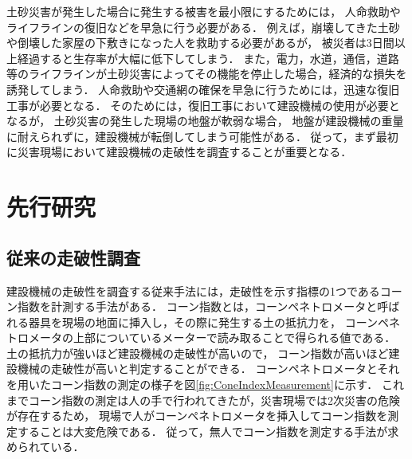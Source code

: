 \clearpage

土砂災害が発生した場合に発生する被害を最小限にするためには，
人命救助やライフラインの復旧などを早急に行う必要がある\cite{国交省2016}．
例えば，崩壊してきた土砂や倒壊した家屋の下敷きになった人を救助する必要があるが，
被災者は3日間以上経過すると生存率が大幅に低下してしまう\cite{国交省2002}．
また，電力，水道，通信，道路等のライフラインが土砂災害によってその機能を停止した場合，経済的な損失を誘発してしまう\cite{豊田2008}\cite{豊田2010}．
人命救助や交通網の確保を早急に行うためには，迅速な復旧工事が必要となる．
そのためには，復旧工事において建設機械の使用が必要となるが，
土砂災害の発生した現場の地盤が軟弱な場合，
地盤が建設機械の重量に耐えられずに，建設機械が転倒してしまう可能性がある\cite{玉手2014}\cite{玉手2008}．
従って，まず最初に災害現場において建設機械の走破性を調査することが重要となる．



\clearpage


\section{先行研究}\label{sec:PreviousStudy}

\subsection{従来の走破性調査}\label{ssec:TraditionalMethod}

建設機械の走破性を調査する従来手法には，走破性を示す指標の1つであるコーン指数を計測する手法がある\cite{Perumpral1987}\cite{Mulqueen1977}．
コーン指数とは，コーンペネトロメータと呼ばれる器具を現場の地面に挿入し，その際に発生する土の抵抗力を，
コーンペネトロメータの上部についているメーターで読み取ることで得られる値である．
土の抵抗力が強いほど建設機械の走破性が高いので，
コーン指数が高いほど建設機械の走破性が高いと判定することができる．
コーンペネトロメータとそれを用いたコーン指数の測定の様子を図\ref{fig:ConeIndexMeasurement}に示す．
これまでコーン指数の測定は人の手で行われてきたが，災害現場では2次災害の危険が存在するため，
現場で人がコーンペネトロメータを挿入してコーン指数を測定することは大変危険である．
従って，無人でコーン指数を測定する手法が求められている．

